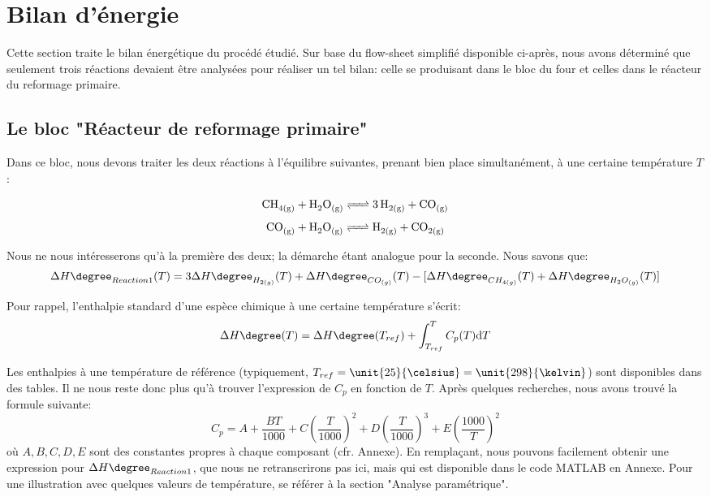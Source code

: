 




\section*{Bilan d'énergie}

Cette section traite le bilan énergétique du procédé étudié.
Sur base du flow-sheet simplifié disponible ci-après, nous avons déterminé que seulement trois réactions
devaient être analysées pour réaliser un tel bilan: celle se produisant dans le bloc du four et celles dans 
le réacteur du reformage primaire.

\subsection*{Le bloc "Réacteur de reformage primaire"}

Dans ce bloc, nous devons traiter les deux réactions à l'équilibre suivantes, prenant bien place simultanément, à une certaine température $T$:

\begin{equation}\label{eq:Reaction1}
\ce{CH_{4(g)} + H_{2}O_{(g)} <=> 3H_{2(g)} + CO_{(g)}}
\end{equation}
\begin{equation}\label{eq:Reaction2} {\ce{CO_{(g)} + H_{2}O_{(g)} <=>  H_{2(g)} + CO_{2(g)}}}
\end{equation}


\bigbreak
Nous ne nous intéresserons qu'à la première des deux; la démarche étant analogue pour la seconde. Nous savons que:
$$\Delta H\degree_{Reaction1}(T)=3\Delta H\degree_{H_{2(g)}}(T) + \Delta H\degree_{CO_{(g)}}(T) -
\lbrack\Delta H\degree_{CH_{4(g)}}(T) + \Delta H\degree_{H_{2}O_{(g)}}(T)\rbrack$$

Pour rappel, l'enthalpie standard d'une espèce chimique à une certaine température s'écrit: \begin{equation}\label{eq:deltaH}
\Delta H\degree(T)=\Delta H\degree(T_{ref})  + \displaystyle \int_{T_{ref}}^{T} C_{p}(T) \mathrm{d}T
\end{equation}


Les enthalpies à une température de référence (typiquement, $T_{ref}=\unit{25}{\celsius}=\unit{298}{\kelvin}$) sont disponibles dans des tables. Il ne nous reste donc plus
qu'à trouver l'expression de $C_p$ en fonction de $T$.
Après quelques recherches\cite{NIST}, nous avons trouvé la formule suivante: \begin{equation}\label{eqref:capacite}
C_p=A+\dfrac{BT}{1000}+C\left(\dfrac{T}{1000}\right)^2+D\left(\dfrac{T}{1000}\right)^3+E\left(\dfrac{1000}{T}\right)^2
\end{equation} où $A,B,C,D,E$ sont des constantes propres à chaque composant (cfr. Annexe).
En remplaçant, nous pouvons facilement obtenir une expression pour $\Delta H\degree_{Reaction1}$, que nous ne retranscrirons pas
ici, mais qui est disponible dans le code \textsc{MATLAB} en Annexe. Pour une illustration avec quelques valeurs de 
température, se référer à la section "Analyse paramétrique".

